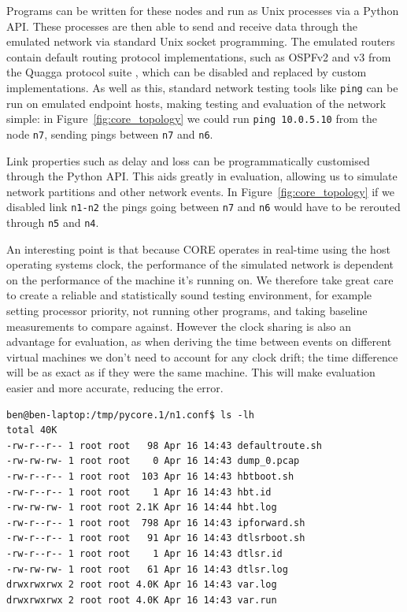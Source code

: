 \documentclass[withindex,glossary,openany]{cam-thesis}
\begin{document}
Programs can be written for these nodes and run as Unix processes via a Python API. These processes are then able to send and receive data through the emulated network via standard Unix socket programming. The emulated routers contain default routing protocol implementations, such as OSPFv2 and v3 from the Quagga protocol suite \cite{QUAGGA}, which can be disabled and replaced by custom implementations. As well as this, standard network testing tools like \texttt{ping} can be run on emulated endpoint hosts, making testing and evaluation of the network simple: in Figure~\ref{fig:core_topology} we could run \texttt{ping 10.0.5.10} from the node \texttt{n7}, sending pings between \texttt{n7} and \texttt{n6}.

Link properties such as delay and loss can be programmatically customised through the Python API. This aids greatly in evaluation, allowing us to simulate network partitions and other network events. In Figure~\ref{fig:core_topology} if we disabled link \texttt{n1-n2} the pings going between \texttt{n7} and \texttt{n6} would have to be rerouted through \texttt{n5} and \texttt{n4}.

An interesting point is that because CORE operates in real-time using the host operating systems clock, the performance of the simulated network is dependent on the performance of the machine it's running on. We therefore take great care to create a reliable and statistically sound testing environment, for example setting processor priority, not running other programs, and taking baseline measurements to compare against. However the clock sharing is also an advantage for evaluation, as when deriving the time between events on different virtual machines we don't need to account for any clock drift; the time difference will be as exact as if they were the same machine. This will make evaluation easier and more accurate, reducing the error.

\begin{minipage}{1\textwidth} \centering
\begin{lstlisting}[label=core_filesystem, frame=tb, caption=Example of a virtualised file-system]
ben@ben-laptop:/tmp/pycore.1/n1.conf$ ls -lh
total 40K
-rw-r--r-- 1 root root   98 Apr 16 14:43 defaultroute.sh
-rw-rw-rw- 1 root root    0 Apr 16 14:43 dump_0.pcap
-rw-r--r-- 1 root root  103 Apr 16 14:43 hbtboot.sh
-rw-r--r-- 1 root root    1 Apr 16 14:43 hbt.id
-rw-rw-rw- 1 root root 2.1K Apr 16 14:44 hbt.log
-rw-r--r-- 1 root root  798 Apr 16 14:43 ipforward.sh
-rw-r--r-- 1 root root   91 Apr 16 14:43 dtlsrboot.sh
-rw-r--r-- 1 root root    1 Apr 16 14:43 dtlsr.id
-rw-rw-rw- 1 root root   61 Apr 16 14:43 dtlsr.log
drwxrwxrwx 2 root root 4.0K Apr 16 14:43 var.log
drwxrwxrwx 2 root root 4.0K Apr 16 14:43 var.run
\end{lstlisting}
\end{minipage}
\end{document}
